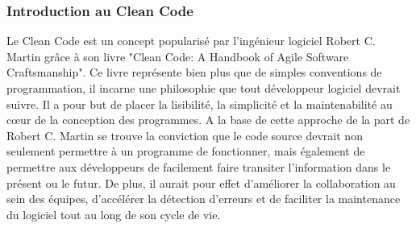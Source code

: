 \documentclass{rapport}
\begin{document}
\subsubsection{Introduction au Clean Code}
Le Clean Code est un concept popularisé par l'ingénieur logiciel Robert C. Martin grâce à son livre "Clean Code: A Handbook of Agile Software Craftsmanship". Ce livre représente bien plus que de simples conventions de programmation, il incarne une philosophie que tout développeur logiciel devrait suivre. Il a pour but de placer la lisibilité, la simplicité et la maintenabilité au cœur de la conception des programmes. A la base de cette approche de la part de Robert C. Martin se trouve la conviction que le code source devrait non seulement permettre à un programme de fonctionner, mais également de permettre aux développeurs de facilement faire transiter l'information dans le présent ou le futur. De plus, il aurait pour effet d'améliorer la collaboration au sein des équipes, d'accélérer la détection d'erreurs et de faciliter la maintenance du logiciel tout au long de son cycle de vie.
\end{document}
